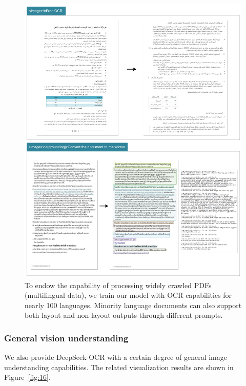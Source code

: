 \documentclass[11pt, a4paper, logo, copyright, nonumbering]{deepseek}
\begin{document}
\begin{CJK*}{UTF8}{gbsn}
\begin{figure}[!h]
	\centering
    \includegraphics[width=1.0\linewidth]{figures/9.pdf}
	\caption{To endow the capability of processing widely crawled PDFs (multilingual data), we train our model with OCR capabilities for nearly 100 languages. Minority language documents can also support both layout and non-layout outputs through different prompts.}
	\label{fig:15}
\end{figure}

\subsubsection{General vision understanding}
We also provide DeepSeek-OCR with a certain degree of general image understanding capabilities. The related visualization results are shown in Figure~\ref{fig:16}.


\end{CJK*}
\end{document}
